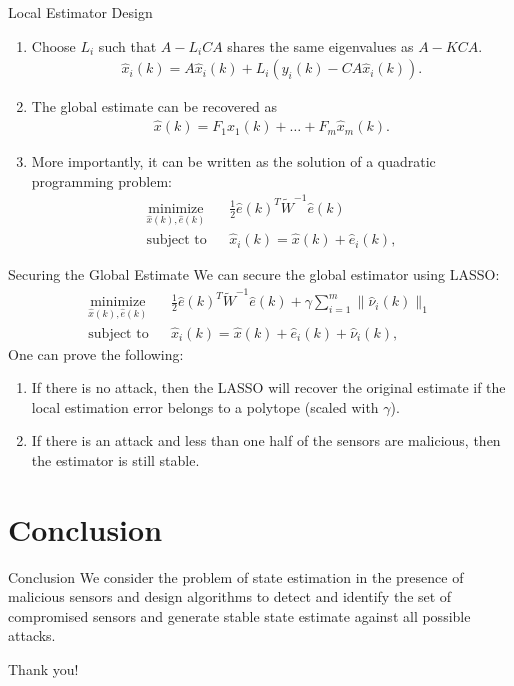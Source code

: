 \documentclass[10pt]{beamer}
\begin{document}
\begin{frame}{Local Estimator Design}
\begin{enumerate}
\item  Choose $L_i$ such that $A-L_iCA$ shares the same eigenvalues as $A-KCA$.
\begin{align*}
\hat x_i(k) = A \hat x_i(k) + L_i (y_i(k)-CA\hat x_i(k)).
\end{align*}  
\item The global estimate can be recovered as
\begin{align*}
\hat x(k) = F_1\hat x_1(k)+\dots+F_m\hat x_m(k).
\end{align*}
\item More importantly, it can be written as the solution of a quadratic programming problem:
\begin{align*}
  &\mathop{\textrm{minimize}}\limits_{\hat x(k),\hat e(k)}&
  & \frac{1}{2}\hat e(k)^T \tilde W^{-1} \hat e(k)\\
  &\textrm{subject to} &
  &\hat x_i(k)  =  \hat x(k) + \hat e_i(k),&
\end{align*}
\end{enumerate}
\end{frame}

\begin{frame}{Securing the Global Estimate}
We can secure the global estimator using LASSO:
\begin{align*}
  &\mathop{\textrm{minimize}}\limits_{\hat x(k),\hat e(k)}&
  & \frac{1}{2}\hat e(k)^T \tilde W^{-1} \hat e(k) + \gamma \sum_{i=1}^m \|\hat \nu_i(k)\|_1\\
  &\textrm{subject to} &
  &\hat x_i(k)  =  \hat x(k) + \hat e_i(k)+\hat \nu_i(k),&
\end{align*}
One can prove the following:
\begin{enumerate}
\item If there is no attack, then the LASSO will recover the original estimate if the local estimation error belongs to a polytope (scaled with $\gamma$).
\item If there is an attack and less than one half of the sensors are malicious, then the estimator is still stable.
\end{enumerate}
\end{frame}
\section{Conclusion}
\begin{frame}{Conclusion}
  We consider the problem of state estimation in the presence of malicious sensors and design algorithms to detect and identify the set of compromised sensors and generate stable state estimate against all possible attacks.
\end{frame}

\begin{frame}[standout]
  Thank you!
\end{frame}
\end{document}
